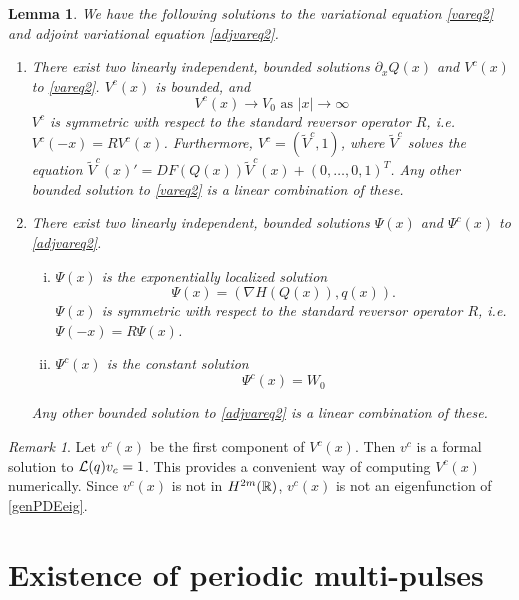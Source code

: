 \documentclass[11pt,reqno]{amsart}
\theoremstyle{plain}
\newtheorem{lemma}[theorem]{Lemma}
\theoremstyle{definition}
\theoremstyle{remark}
\newtheorem{remark}[theorem]{Remark}
\begin{document}
\begin{lemma}\label{varadjsolutions}
We have the following solutions to the variational equation \cref{vareq2} and adjoint variational equation \cref{adjvareq2}.
\begin{enumerate}
	\item There exist two linearly independent, bounded solutions $\partial_x Q(x)$ and $V^c(x)$ to \eqref{vareq2}. $V^c(x)$ is bounded, and
	\begin{equation}
	V^c(x) \rightarrow V_0 \text{ as }|x| \rightarrow \infty
	\end{equation}
	$V^c$ is symmetric with respect to the standard reversor operator $R$, i.e. $V^c(-x) = R V^c(x)$. Furthermore, $V^c = (\tilde{V}^c, 1)$, where $\tilde{V}^c$ solves the equation $\tilde{V}^c(x)' = DF(Q(x)) \tilde{V}^c(x) + (0, \dots, 0, 1)^T$. Any other bounded solution to \eqref{vareq2} is a linear combination of these.

	\item There exist two linearly independent, bounded solutions $\Psi(x)$ and $\Psi^c(x)$ to \eqref{adjvareq2}.
	\begin{enumerate}[(i)]
	\item $\Psi(x)$ is the exponentially localized solution
	\begin{equation}\label{psicomponents}
	\Psi(x) = (\nabla H(Q(x)), q(x)).
	\end{equation}
	$\Psi(x)$ is symmetric with respect to the standard reversor operator $R$, i.e. $\Psi(-x) = R \Psi(x)$. 
	\item $\Psi^c(x)$ is the constant solution
	\begin{equation}
	\Psi^c(x) = W_0
	\end{equation}
	\end{enumerate}
	Any other bounded solution to \eqref{adjvareq2} is a linear combination of these.
\end{enumerate}
\end{lemma}

\begin{remark}\label{remark:computeVc}
Let $v^c(x)$ be the first component of $V^c(x)$. Then $v^c$ is a formal solution to $\mathcal{L}(q) v_c = 1$. This provides a convenient way of computing $V^c(x)$ numerically. Since $v^c(x)$ is not in $H^{2m}(\mathbb{R})$, $v^c(x)$ is not an eigenfunction of \cref{genPDEeig}.
\end{remark}

\section{Existence of periodic multi-pulses}\label{sec:perexist}
\end{document}
